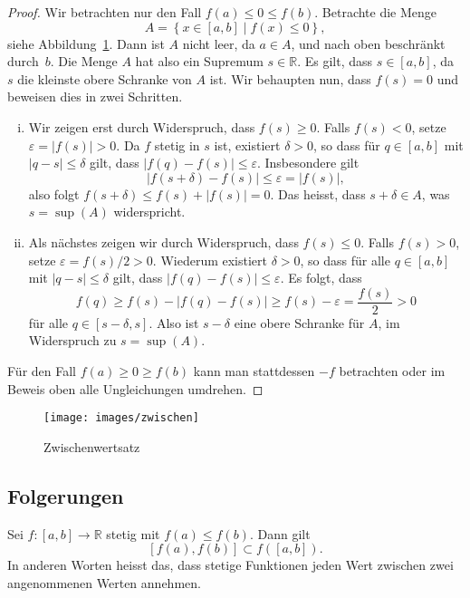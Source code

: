 \documentclass[../main.tex]{subfiles}
\begin{document}
\begin{proof}
  Wir betrachten nur den Fall $f(a) \leq 0 \leq f(b)$.
  Betrachte die Menge
  \[
    A = \left\{x \in [a, b] \mid f(x) \leq 0\right\},
  \]
  siehe Abbildung~\ref{fig:zwischen}.
  Dann ist $A$ nicht leer, da $a \in A$, und nach oben
  beschränkt durch~$b$.
  Die Menge $A$ hat also ein Supremum $s \in \mathbb{R}$.
  Es gilt, dass $s \in [a,b]$, da $s$ die kleinste
  obere Schranke von $A$ ist.
  Wir behaupten nun, dass $f(s) = 0$ und beweisen
  dies in zwei Schritten.

  \begin{enumerate}[(i)]
    \item Wir zeigen erst durch Widerspruch, dass $f(s) \geq 0$.
      Falls $f(s) < 0$, setze
      $\varepsilon = |f(s)| > 0$. Da $f$ stetig in $s$ ist,
      existiert $\delta > 0$, so dass
      für $q \in [a, b]$
      mit $|q - s| \leq \delta$ gilt, dass
      $|f(q) - f(s)| \leq \varepsilon$.
      Insbesondere gilt
      \[
      |f(s + \delta) - f(s)| \leq \varepsilon = |f(s)|,
      \]
        also folgt
        $f(s + \delta) \leq f(s) + |f(s)| = 0$.
      Das heisst, dass $s + \delta \in A$, was
      $s = \sup(A)$ widerspricht.
    \item Als nächstes zeigen wir durch Widerspruch,
      dass $f(s) \leq 0$. 
      Falls $f(s) > 0$,
      setze $\varepsilon = f(s)/2 > 0$.
      Wiederum existiert $\delta > 0$, 
      so dass für alle $q \in [a, b]$ mit $|q- s| \leq \delta$ 
      gilt, dass
      $|f(q) - f(s)| \leq \varepsilon$.
      Es folgt, dass
      \[
        f(q) \geq f(s) - |f(q) - f(s)| \geq f(s) - \varepsilon = \frac{f(s)}{2}
        > 0
      \]
      für alle $q \in [s - \delta, s]$.
      Also ist $s - \delta$ eine obere Schranke für $A$,
      im Widerspruch zu $s = \sup(A)$.
  \end{enumerate}
  Für den Fall $f(a) \geq 0 \geq f(b)$ kann man
  stattdessen $-f$ betrachten
  oder im Beweis oben alle Ungleichungen umdrehen.
\end{proof}

\begin{figure}[htb]
  \centering
  \texttt{[image: images/zwischen]}
  \caption{Zwischenwertsatz}%
  \label{fig:zwischen}
\end{figure}

\subsection*{Folgerungen}
\begin{zwischenwertsatz}
  Sei $f \colon [a, b] \to \mathbb{R} $
  stetig mit $f(a) \leq f(b)$.
  Dann gilt 
  \[[f(a), f(b)] \subset f([a, b]).\]
  In anderen Worten heisst das, dass stetige
  Funktionen jeden Wert zwischen
  zwei angenommenen Werten annehmen.
\end{zwischenwertsatz}
\end{document}
